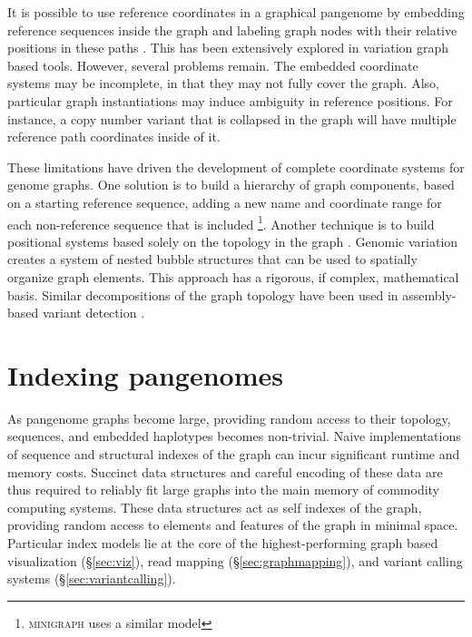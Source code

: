 It is possible to use reference coordinates in a graphical pangenome by embedding reference sequences inside the graph and labeling graph nodes with their relative positions in these paths \cite{Garrison_2018,Garrison_2019}.
This has been extensively explored in variation graph based tools.
However, several problems remain.
The embedded coordinate systems may be incomplete, in that they may not fully cover the graph.
Also, particular graph instantiations may induce ambiguity in reference positions.
For instance, a copy number variant that is collapsed in the graph will have multiple reference path coordinates inside of it.

These limitations have driven the development of complete coordinate systems for genome graphs.
One solution is to build a hierarchy of graph components, based on a starting reference sequence, adding a new name and coordinate range for each non-reference sequence that is included \cite{Rand_2017}\footnote{\textsc{minigraph} uses a similar model}.
Another technique is to build positional systems based solely on the topology in the graph \cite{paten2018superbubbles}.
Genomic variation creates a system of nested bubble structures that can be used to spatially organize graph elements.
This approach has a rigorous, if complex, mathematical basis.
Similar decompositions of the graph topology have been used in assembly-based variant detection \cite{Iqbal_2012, Onodera_2013}.


\section{Indexing pangenomes} %
\label{sec:indexing}

As pangenome graphs become large, providing random access to their topology, sequences, and embedded haplotypes becomes non-trivial.
Naive implementations of sequence and structural indexes of the graph can incur significant runtime and memory costs.
Succinct data structures and careful encoding of these data are thus required to reliably fit large graphs into the main memory of commodity computing systems.
These data structures act as self indexes of the graph, providing random access to elements and features of the graph in minimal space.
Particular index models lie at the core of the highest-performing graph based visualization (\S \ref{sec:viz}), read mapping (\S \ref{sec:graphmapping}), and variant calling systems (\S \ref{sec:variantcalling}).

